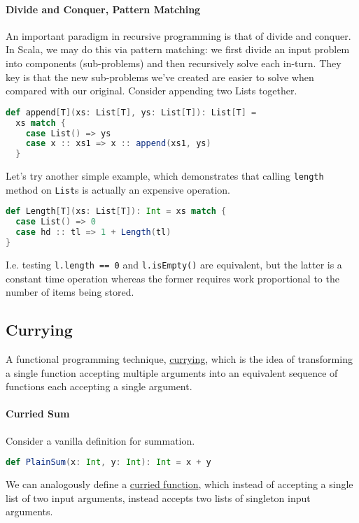 \documentclass[12pt,letterpaper,twoside]{article}
\begin{document}
\paragraph{Divide and Conquer, Pattern Matching} An important paradigm in recursive 
programming is that of divide and conquer. In Scala, we may do this via pattern matching:
we first divide an input problem into components (sub-problems) and then recursively solve
each in-turn. They key is that the new sub-problems we've created are easier to solve
when compared with our original. Consider appending two Lists together.
\begin{lstlisting}[language=Scala]
def append[T](xs: List[T], ys: List[T]): List[T] = 
  xs match {
    case List() => ys
    case x :: xs1 => x :: append(xs1, ys)
  } \end{lstlisting}
Let's try another simple example, which demonstrates that calling \texttt{length} method
on \texttt{List}s is actually an expensive operation.
\begin{lstlisting}[language=Scala]
def Length[T](xs: List[T]): Int = xs match { 
  case List() => 0
  case hd :: tl => 1 + Length(tl)
} \end{lstlisting}
I.e. testing \texttt{l.length == 0} and \texttt{l.isEmpty()} are equivalent, but the 
latter is a constant time operation whereas the former requires work proportional to the
number of items being stored.

\subsection{Currying} A functional programming technique, 
\href{https://en.wikipedia.org/wiki/Currying}{currying}, 
which is the idea of transforming a single function accepting multiple
arguments into an equivalent sequence of functions each accepting a single argument.

\paragraph{Curried Sum} Consider a vanilla definition for summation.
\begin{lstlisting}[language=Scala]
def PlainSum(x: Int, y: Int): Int = x + y \end{lstlisting}
We can analogously define a \href{https://www.artima.com/pins1ed/control-abstraction.html#9.3}{curried function}, which instead of accepting a single list
of two input arguments, instead accepts two lists of singleton input arguments.
\end{document}
